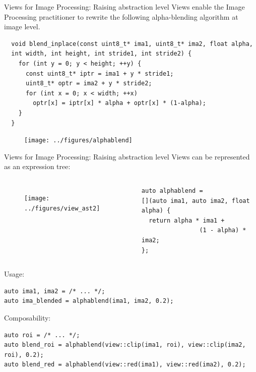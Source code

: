 \documentclass[12pt,aspectratio=169]{beamer}
\begin{document}
\begin{frame}[fragile]{Views for Image Processing: Raising abstraction level}
  Views enable the Image Processing practitioner to rewrite the following alpha-blending algorithm at image level.
  \begin{verbatim}
  void blend_inplace(const uint8_t* ima1, uint8_t* ima2, float alpha,
  int width, int height, int stride1, int stride2) {
    for (int y = 0; y < height; ++y) {
      const uint8_t* iptr = ima1 + y * stride1;
      uint8_t* optr = ima2 + y * stride2;
      for (int x = 0; x < width; ++x)
        optr[x] = iptr[x] * alpha + optr[x] * (1-alpha);
    }
  }
  \end{verbatim}
  \centering
  \begin{figure}
    \texttt{[image: ../figures/alphablend]}
  \end{figure}
\end{frame}

\begin{frame}[fragile]{Views for Image Processing: Raising abstraction level}
  Views can be represented as an expression tree:

  \begin{columns}[T,onlytextwidth]
    \centering
    \begin{figure}
      \texttt{[image: ../figures/view\_ast2]}
    \end{figure}

    \begin{verbatim}
auto alphablend =
[](auto ima1, auto ima2, float alpha) {
  return alpha * ima1 +
                (1 - alpha) * ima2;
};
  \end{verbatim}
  \end{columns}

  \begin{alertblock}{Usage:}
    \begin{verbatim}
auto ima1, ima2 = /* ... */;
auto ima_blended = alphablend(ima1, ima2, 0.2);
    \end{verbatim}
  \end{alertblock}

  \begin{alertblock}{Composability:}
    \begin{verbatim}
auto roi = /* ... */;
auto blend_roi = alphablend(view::clip(ima1, roi), view::clip(ima2, roi), 0.2);
auto blend_red = alphablend(view::red(ima1), view::red(ima2), 0.2);
    \end{verbatim}
  \end{alertblock}

\end{frame}
\end{document}
